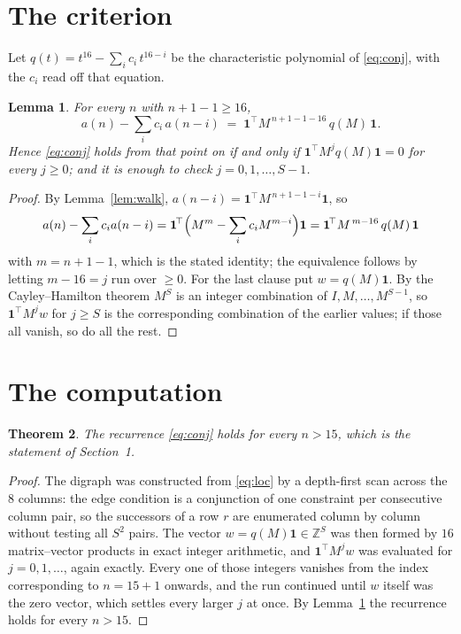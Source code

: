 \documentclass[11pt,a4paper]{article}
\theoremstyle{plain}
\newtheorem{theorem}{Theorem}
\newtheorem{lemma}[theorem]{Lemma}
\theoremstyle{definition}
\begin{document}
\section{The criterion}

Let $q(t)=t^{16}-\sum_i c_i\,t^{16-i}$ be the characteristic polynomial of
\eqref{eq:conj}, with the $c_i$ read off that equation.

\begin{lemma}\label{lem:crit}
For every $n$ with $n+1-1\ge16$,
\[
a(n)-\sum_i c_i\,a(n-i)\;=\;\mathbf{1}^{\!\top}M^{\,n+1-1-16}\,q(M)\,\mathbf{1} .
\]
Hence \eqref{eq:conj} holds from that point on if and only if
$\mathbf{1}^{\!\top}M^{j}q(M)\mathbf{1}=0$ for every $j\ge0$; and it is enough to check
$j=0,1,\dots,S-1$.
\end{lemma}

\begin{proof}
By Lemma~\ref{lem:walk}, $a(n-i)=\mathbf{1}^{\!\top}M^{\,n+1-1-i}\mathbf{1}$, so
\[
a(n)-\sum_i c_i a(n-i)
=\mathbf{1}^{\!\top}\Bigl(M^{m}-\sum_i c_i M^{m-i}\Bigr)\mathbf{1}
=\mathbf{1}^{\!\top}M^{\,m-16}\,q(M)\,\mathbf{1}
\]
with $m=n+1-1$, which is the stated identity; the equivalence follows by letting
$m-16=j$ run over $\ge0$. For the last clause put $w=q(M)\mathbf{1}$. By the
Cayley--Hamilton theorem $M^{S}$ is an integer combination of $I,M,\dots,M^{S-1}$, so
$\mathbf{1}^{\!\top}M^{j}w$ for $j\ge S$ is the corresponding combination of the earlier
values; if those all vanish, so do all the rest.
\end{proof}

\section{The computation}

\begin{theorem}
The recurrence \eqref{eq:conj} holds for every $n>15$, which is the statement of
Section~1.
\end{theorem}

\begin{proof}
The digraph was constructed from \eqref{eq:loc} by a depth-first scan across the $8$
columns: the edge condition is a conjunction of one constraint per consecutive column
pair, so the successors of a row $r$ are enumerated column by column without testing all
$S^2$ pairs. The vector $w=q(M)\mathbf{1}\in\mathbb{Z}^{S}$ was then formed by $16$
matrix--vector products in exact integer arithmetic, and $\mathbf{1}^{\!\top}M^{j}w$ was
evaluated for $j=0,1,\dots$, again exactly. Every one of those integers vanishes from the
index corresponding to $n=15+1$ onwards, and the run continued until $w$ itself was the
zero vector, which settles every larger $j$ at once. By Lemma~\ref{lem:crit} the recurrence
holds for every $n>15$.
\end{proof}
\end{document}
